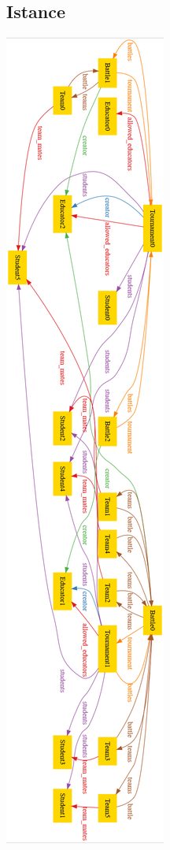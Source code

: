 \documentclass{article}
\begin{document}
\subsection{Istance}
\begin{center}
  \includegraphics[width=\linewidth]{istance.png}
\label{fig:uc13}
\end{center}
\end{document}
